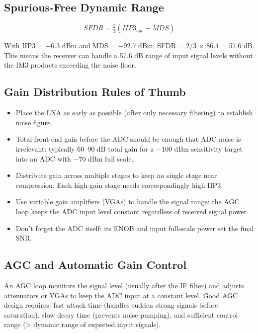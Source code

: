 
      

\subsection{Spurious-Free Dynamic Range}

      
\[SFDR = \tfrac{2}{3}(IIP3_{sys} - MDS)\]

      

With IIP3 = −6.3 dBm and MDS = −92.7 dBm: SFDR = 2/3 × 86.4 = 57.6 dB. This means the receiver can handle a 57.6 dB range of input signal levels without the IM3 products exceeding the noise floor.

      

\subsection{Gain Distribution Rules of Thumb}

      
\begin{itemize}

        \item Place the LNA as early as possible (after only necessary filtering) to establish noise figure.

        \item Total front-end gain before the ADC should be enough that ADC noise is irrelevant: typically 60–90 dB total gain for a −100 dBm sensitivity target into an ADC with −70 dBm full scale.

        \item Distribute gain across multiple stages to keep no single stage near compression. Each high-gain stage needs correspondingly high IIP3.

        \item Use variable gain amplifiers (VGAs) to handle the signal range: the AGC loop keeps the ADC input level constant regardless of received signal power.

        \item Don't forget the ADC itself: its ENOB and input full-scale power set the final SNR.

      
\end{itemize}

      

\subsection{AGC and Automatic Gain Control}

      

An AGC loop monitors the signal level (usually after the IF filter) and adjusts attenuators or VGAs to keep the ADC input at a constant level. Good AGC design requires: fast attack time (handles sudden strong signals before saturation), slow decay time (prevents noise pumping), and sufficient control range (\textgreater{} dynamic range of expected input signals).



